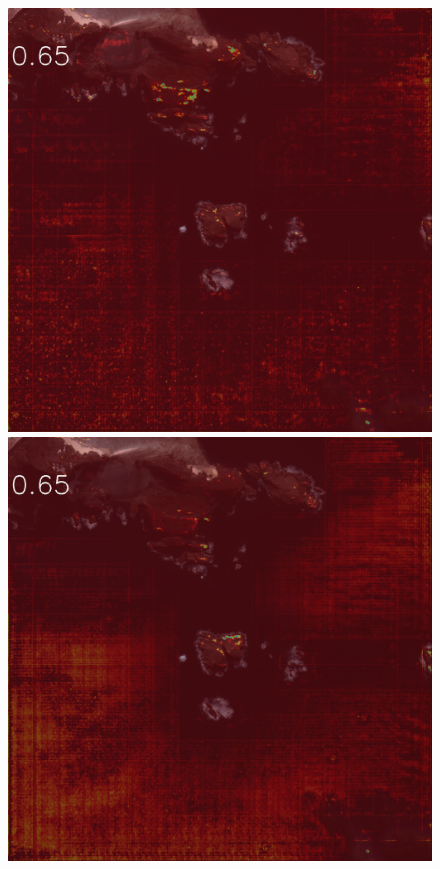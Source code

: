 \documentclass[runningheads]{llncs}
\begin{document}
\begin{figure}[h]
\includegraphics[width=\subFigx]{./fig/datagrow/MSE_single_unet_train_0_1.txt_bias-1_bs128_do0.1e25/orthoWV02_11FEB251253222-M1BS-1030010009092C00_u08rfAEAC.png}
\includegraphics[width=\subFigx]{./fig/datagrow/MSE_single_unet_train_0_2.txt_bias-1_bs128_do0.1e25/orthoWV02_11FEB251253222-M1BS-1030010009092C00_u08rfAEAC.png}

\end{figure}
\end{document}

